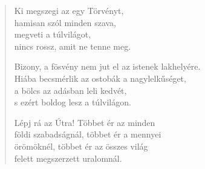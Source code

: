 \begin{verse}
 Ki megszegi az egy Törvényt,\\
hamisan szól minden szava,\\
megveti a túlvilágot,\\
nincs rossz, amit ne tenne meg.

\newpage

 Bizony, a fösvény nem jut el az istenek lakhelyére.\\
Hiába becsmérlik az ostobák a nagylelkűséget,\\
a bölcs az adásban leli kedvét,\\
s ezért boldog lesz a túlvilágon.

 Lépj rá az Útra! Többet ér az minden\\
földi szabadságnál, többet ér a mennyei\\
örömöknél, többet ér az összes világ\\
felett megszerzett uralomnál.

\end{verse}
